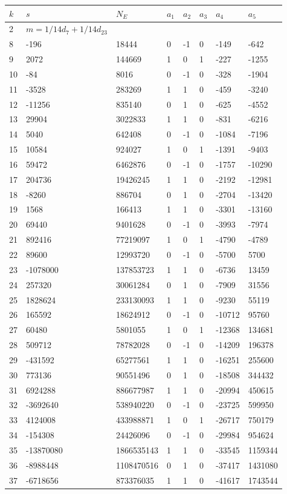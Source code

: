 \documentclass{amsart}
\begin{document}
\begin{longtable}{|l|l|l|lllll|}
\hline
$k$ & $s$ & $N_E$ & $a_1$ & $a_2$ & $a_3$ & $a_4$ & $a_5$\\
\hline
2&$m=1/14d_{7}+1/14d_{23}$&&\multicolumn{5}{c|}{}\\
8&-196&18444&0&-1&0&-149&-642\\
9&2072&144669&1&0&1&-227&-1255\\
10&-84&8016&0&-1&0&-328&-1904\\
11&-3528&283269&1&1&0&-459&-3240\\
12&-11256&835140&0&1&0&-625&-4552\\
13&29904&3022833&1&1&0&-831&-6216\\
14&5040&642408&0&-1&0&-1084&-7196\\
15&10584&924027&1&0&1&-1391&-9403\\
16&59472&6462876&0&-1&0&-1757&-10290\\
17&204736&19426245&1&1&0&-2192&-12981\\
18&-8260&886704&0&1&0&-2704&-13420\\
19&1568&166413&1&1&0&-3301&-13160\\
20&69440&9401628&0&-1&0&-3993&-7974\\
21&892416&77219097&1&0&1&-4790&-4789\\
22&89600&12993720&0&-1&0&-5700&5700\\
23&-1078000&137853723&1&1&0&-6736&13459\\
24&257320&30061284&0&1&0&-7909&31556\\
25&1828624&233130093&1&1&0&-9230&55119\\
26&165592&18624912&0&-1&0&-10712&95760\\
27&60480&5801055&1&0&1&-12368&134681\\
28&509712&78782028&0&-1&0&-14209&196378\\
29&-431592&65277561&1&1&0&-16251&255600\\
30&773136&90551496&0&1&0&-18508&344432\\
31&6924288&886677987&1&1&0&-20994&450615\\
32&-3692640&538940220&0&-1&0&-23725&599950\\
33&4124008&433988871&1&0&1&-26717&750179\\
34&-154308&24426096&0&-1&0&-29984&954624\\
35&-13870080&1866535143&1&1&0&-33545&1159344\\
36&-8988448&1108470516&0&1&0&-37417&1431080\\
37&-6718656&873376035&1&1&0&-41617&1743544\\

\end{longtable}
\end{document}

